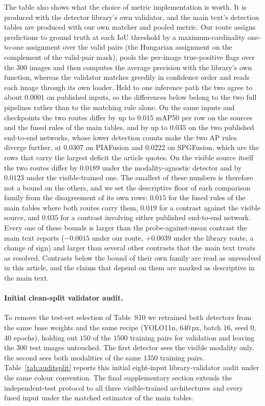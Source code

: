 \documentclass[10pt,a4paper]{article}
\begin{document}
The table also shows what the choice of metric implementation is worth. It is
produced with the detector library's own validator, and the main text's detection
tables are produced with our own matcher and pooled metric. Our route assigns
predictions to ground truth at each IoU threshold by a maximum-cardinality one-to-one
assignment over the valid pairs (the Hungarian assignment on the complement of the
valid-pair mask), pools the per-image true-positive flags over the 300 images and then
computes the average precision with the library's own function, whereas the validator
matches greedily in confidence order and reads each image through its own loader. Held
to one inference path the two agree to about $0.0001$ on published inputs, so the
differences below belong to the two full pipelines rather than to the matching rule
alone. On the same inputs and
checkpoints the two routes differ by up to $0.015$ mAP50 per row on the sources and
the fused rules of the main tables, and by up to $0.035$ on the two published
end-to-end networks, whose lower detection counts make the two AP rules diverge
further, at $0.0307$ on PIAFusion and $0.0222$ on SPGFusion, which are the rows that
carry the largest deficit the article quotes. On the visible source itself the two
routes differ by $0.0189$ under the modality-agnostic detector and by $0.0123$ under
the visible-trained one. The smallest of these numbers is therefore not a bound on
the others, and we set the descriptive floor of each comparison family from the
disagreement of its own rows: $0.015$ for the fused rules of the main tables where
both routes carry them, $0.019$ for a contrast against the visible source, and
$0.035$ for a contrast involving either published end-to-end network. Every one of
these bounds is larger than the probe-against-mean contrast the main text reports
($-0.0015$ under our route, $+0.0039$ under the library route, a change of sign) and
larger than several other contrasts that the main text treats as resolved. Contrasts
below the bound of their own family are read as unresolved in this article, and the
claims that depend on them are marked as descriptive in the main text.

\paragraph{Initial clean-split validator audit.}
To remove the test-set selection of Table~S10 we retrained both
detectors from the same base weights and the same recipe (YOLO11n, $640$\,px, batch
$16$, seed $0$, $40$ epochs), holding out $150$ of the $1500$ training pairs for
validation and leaving the $300$ test images untouched. The first detector sees the
visible modality only, the second sees both modalities of the same $1350$ training
pairs. Table~\ref{tab:auditsplit} reports this initial eight-input library-validator
audit under the same colour convention. The final supplementary section extends the
independent-test protocol to all three visible-trained architectures and every fused
input under the matched estimator of the main tables.
\end{document}
